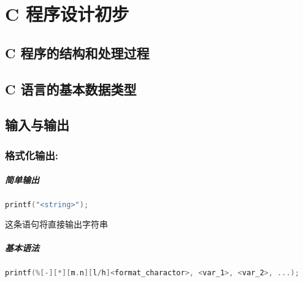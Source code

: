 \chapter{C 程序设计初步}
\section{C 程序的结构和处理过程}

\section{C 语言的基本数据类型}

\section{输入与输出}
    \subsection{格式化输出: }
        \paragraph{简单输出}
            \begin{lstlisting}[language = {C}, gobble = 16]
                printf("<string>");
            \end{lstlisting}
            这条语句将直接输出字符串 


        \paragraph{基本语法}
            \begin{lstlisting}[language = {C}, gobble = 16]
                printf(%[-][*][m.n][l/h]<format_charactor>, <var_1>, <var_2>, ...);
            \end{lstlisting}

